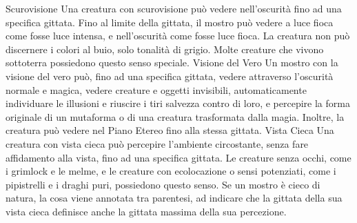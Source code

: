 \begin{multicols}{2}
Scurovisione
Una creatura con scurovisione può vedere nell’oscurità
fino ad una specifica gittata. Fino al limite della gittata, il
mostro può vedere a luce fioca come fosse luce
intensa, e nell’oscurità come fosse luce fioca. La
creatura non può discernere i colori al buio, solo
tonalità di grigio. Molte creature che vivono sottoterra
possiedono questo senso speciale.
Visione del Vero
Un mostro con la visione del vero può, fino ad una
specifica gittata, vedere attraverso l’oscurità normale e
magica, vedere creature e oggetti invisibili,
automaticamente individuare le illusioni e riuscire i tiri
salvezza contro di loro, e percepire la forma originale di
un mutaforma o di una creatura trasformata dalla
magia. Inoltre, la creatura può vedere nel Piano Etereo
fino alla stessa gittata.
Vista Cieca
Una creatura con vista cieca può percepire l’ambiente
circostante, senza fare affidamento alla vista, fino ad
una specifica gittata.
Le creature senza occhi, come i grimlock e le melme, e
le creature con ecolocazione o sensi potenziati, come i
pipistrelli e i draghi puri, possiedono questo senso.
Se un mostro è cieco di natura, la cosa viene annotata
tra parentesi, ad indicare che la gittata della sua vista
cieca definisce anche la gittata massima della sua
percezione.
 

\end{multicols}
